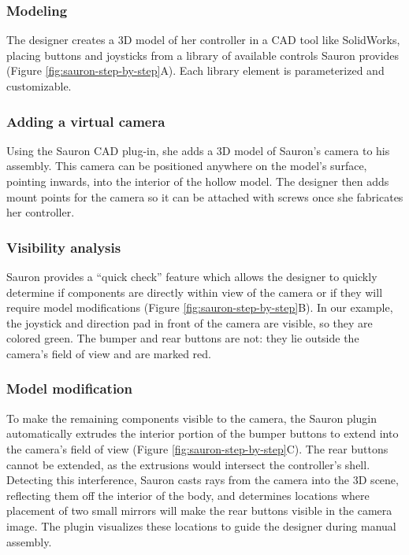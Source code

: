 \subsubsection{Modeling} The designer creates a 3D model of her controller in a CAD tool like SolidWorks, placing buttons and joysticks from a library of available controls Sauron provides (Figure \ref{fig:sauron-step-by-step}A). Each library element is parameterized and customizable.

\subsubsection{Adding a virtual camera} Using the Sauron CAD plug-in, she adds a 3D model of Sauron's camera to his assembly. This camera can be positioned anywhere on the model's surface, pointing inwards, into the interior of the hollow model. The designer then adds mount points for the camera so it can be attached with screws once she fabricates her controller.

\subsubsection{Visibility analysis} Sauron provides a ``quick check'' feature which allows the designer to quickly determine if components are directly within view of the camera or if they will require model modifications (Figure \ref{fig:sauron-step-by-step}B). %
In our example, the joystick and direction pad in front of the camera are visible, so they are colored green. The bumper and rear buttons are not: they lie outside the camera's field of view and are marked red. 

\subsubsection{Model modification} To make the remaining components visible to the camera, the Sauron plugin automatically extrudes the interior portion of the bumper buttons to extend into the camera's field of view (Figure \ref{fig:sauron-step-by-step}C). The rear buttons cannot be extended, as the extrusions would intersect the controller's shell. Detecting this interference, Sauron casts rays from the camera into the 3D scene, reflecting them off the interior of the body, and determines locations where placement of two small mirrors will make the rear buttons visible in the camera image. The plugin visualizes these locations to guide the designer during manual assembly.

